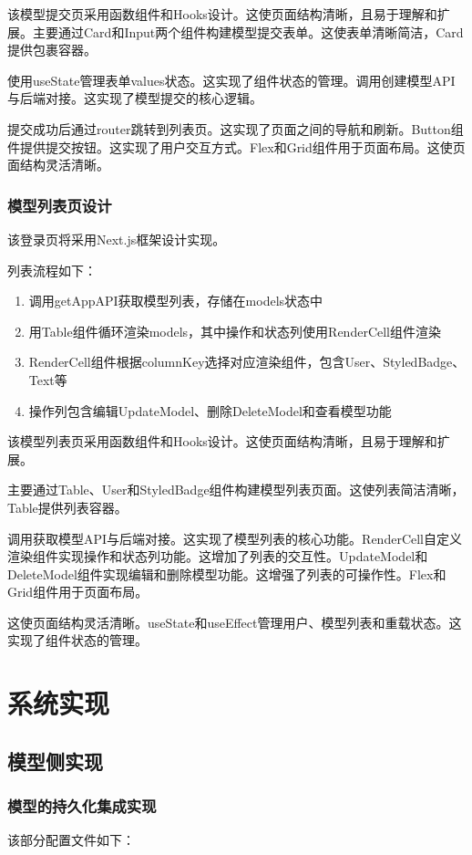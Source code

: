 \documentclass{HDU-Bachelor-Thesis}
\begin{document}
该模型提交页采用函数组件和Hooks设计。这使页面结构清晰，且易于理解和扩展。主要通过Card和Input两个组件构建模型提交表单。这使表单清晰简洁，Card提供包裹容器。

使用useState管理表单values状态。这实现了组件状态的管理。调用创建模型API与后端对接。这实现了模型提交的核心逻辑。

提交成功后通过router跳转到列表页。这实现了页面之间的导航和刷新。Button组件提供提交按钮。这实现了用户交互方式。Flex和Grid组件用于页面布局。这使页面结构灵活清晰。

\subsubsection{模型列表页设计}

该登录页将采用Next.js框架设计实现。

列表流程如下：

\begin{enumerate}
\item 调用getAppAPI获取模型列表，存储在models状态中
\item 用Table组件循环渲染models，其中操作和状态列使用RenderCell组件渲染
\item RenderCell组件根据columnKey选择对应渲染组件，包含User、StyledBadge、Text等
\item 操作列包含编辑UpdateModel、删除DeleteModel和查看模型功能
\end{enumerate}

该模型列表页采用函数组件和Hooks设计。这使页面结构清晰，且易于理解和扩展。

主要通过Table、User和StyledBadge组件构建模型列表页面。这使列表简洁清晰，Table提供列表容器。

调用获取模型API与后端对接。这实现了模型列表的核心功能。RenderCell自定义渲染组件实现操作和状态列功能。这增加了列表的交互性。UpdateModel和DeleteModel组件实现编辑和删除模型功能。这增强了列表的可操作性。Flex和Grid组件用于页面布局。

这使页面结构灵活清晰。useState和useEffect管理用户、模型列表和重载状态。这实现了组件状态的管理。

\setcounter{table}{0}
\setcounter{figure}{0}
\clearpage
\section{系统实现}
\subsection{模型侧实现}
\subsubsection{模型的持久化集成实现}
该部分配置文件如下：
\end{document}
